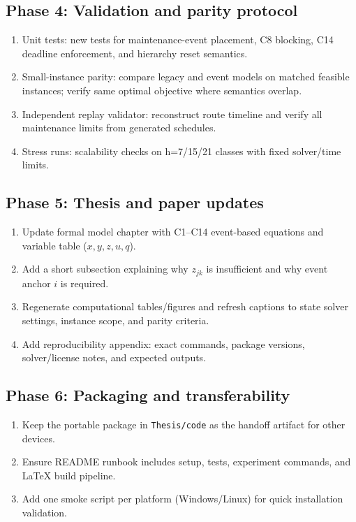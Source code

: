 \documentclass[11pt,a4paper]{article}
\begin{document}
\subsection*{Phase 4: Validation and parity protocol}
\begin{enumerate}
  \item Unit tests: new tests for maintenance-event placement, C8 blocking,
  C14 deadline enforcement, and hierarchy reset semantics.
  \item Small-instance parity: compare legacy and event models on matched
  feasible instances; verify same optimal objective where semantics overlap.
  \item Independent replay validator: reconstruct route timeline and verify
  all maintenance limits from generated schedules.
  \item Stress runs: scalability checks on h=7/15/21 classes with fixed
  solver/time limits.
\end{enumerate}

\subsection*{Phase 5: Thesis and paper updates}
\begin{enumerate}
  \item Update formal model chapter with C1--C14 event-based equations and
  variable table ($x,y,z,u,q$).
  \item Add a short subsection explaining why $z_{jk}$ is insufficient and
  why event anchor $i$ is required.
  \item Regenerate computational tables/figures and refresh captions to state
  solver settings, instance scope, and parity criteria.
  \item Add reproducibility appendix: exact commands, package versions,
  solver/license notes, and expected outputs.
\end{enumerate}

\subsection*{Phase 6: Packaging and transferability}
\begin{enumerate}
  \item Keep the portable package in \texttt{Thesis/code} as the handoff
  artifact for other devices.
  \item Ensure README runbook includes setup, tests, experiment commands,
  and LaTeX build pipeline.
  \item Add one smoke script per platform (Windows/Linux) for quick
  installation validation.
\end{enumerate}
\end{document}
